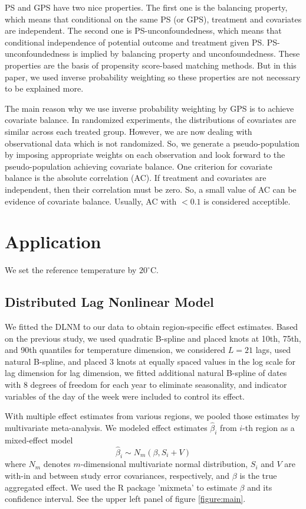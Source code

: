 \documentclass[12pt]{article}
\begin{document}
PS and GPS have two nice properties\cite{rosenbaum1983, hirano2004}.
The first one is the balancing property, which means that conditional on the same PS (or GPS),
treatment and covariates are independent.
The second one is PS-unconfoundedness, 
which means that conditional independence of potential outcome and treatment given PS.
PS-unconfoundedness is implied by balancing property and unconfoundedness.
These properties are the basis of propensity score-based matching methods.
But in this paper, 
we used inverse probability weighting so these properties are not necessary to be explained more.

The main reason why we use inverse probability weighting by GPS is to achieve covariate balance.
In randomized experiments, the distributions of covariates are similar across each treated group.
However, we are now dealing with observational data which is not randomized.
So, we generate a pseudo-population by imposing appropriate weights on each observation
and look forward to the pseudo-population achieving covariate balance.
One criterion for covariate balance is the absolute correlation (AC)\cite{gpsboosting2015}.
If treatment and covariates are independent, then their correlation must be zero.
So, a small value of AC can be evidence of covariate balance.
Usually, AC with $ <0.1 $ is considered acceptible.


\section{Application}
\label{section:application}

We set the reference temperature by $20^\circ$C.
\subsection{Distributed Lag Nonlinear Model}

We fitted the DLNM to our data to obtain region-specific effect estimates.
Based on the previous study\cite{gasparrini2015},
we used quadratic B-spline and placed knots at 10th, 75th, and 90th quantiles
for temperature dimension,
we considered $L = 21$ lags, used natural B-spline, 
and placed $3$ knots at equally spaced values in the log scale for lag dimension
for lag dimension,
we fitted additional natural B-spline of dates with $8$ degrees of freedom for each year
to eliminate seasonality,
and indicator variables of the day of the week were included to control its effect.

With multiple effect estimates from various regions,
we pooled those estimates by multivariate meta-analysis.
We modeled effect estimates $\hat{\beta}_i$ from $i$-th region as a mixed-effect model
\begin{equation}
	\hat{\beta}_i \sim N_m(\beta, S_i + V)
	\label{eqn:dlnmmeta}
\end{equation}
where $N_m$ denotes $m$-dimensional multivariate normal distribution,
$S_i$ and $V$ are with-in and between study error covariances, respectively,
and $\beta$ is the true aggregated effect.
We used the R package 'mixmeta' to estimate $\beta$ and its confidence interval.
See the upper left panel of figure \ref{figure:main}.
\end{document}
